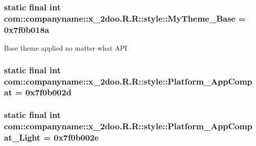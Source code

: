 \hypertarget{classcom_1_1companyname_1_1x__2doo_1_1_r_1_1style_c3cec50d05990fe7235e6851725a287e}{
\subsubsection[{MyTheme\_\-Base}]{\setlength{\rightskip}{0pt plus 5cm}static final int com::companyname::x\_\-2doo.R.R::style::MyTheme\_\-Base = 0x7f0b018a}}
\label{classcom_1_1companyname_1_1x__2doo_1_1_r_1_1style_c3cec50d05990fe7235e6851725a287e}


Base theme applied no matter what API \hypertarget{classcom_1_1companyname_1_1x__2doo_1_1_r_1_1style_76df383bfe1d7bd0d08fe5739b0b4dd5}{
\subsubsection[{Platform\_\-AppCompat}]{\setlength{\rightskip}{0pt plus 5cm}static final int com::companyname::x\_\-2doo.R.R::style::Platform\_\-AppCompat = 0x7f0b002d}}
\label{classcom_1_1companyname_1_1x__2doo_1_1_r_1_1style_76df383bfe1d7bd0d08fe5739b0b4dd5}


\hypertarget{classcom_1_1companyname_1_1x__2doo_1_1_r_1_1style_0d2e7f993e586016b744975db1e6d205}{
\subsubsection[{Platform\_\-AppCompat\_\-Light}]{\setlength{\rightskip}{0pt plus 5cm}static final int com::companyname::x\_\-2doo.R.R::style::Platform\_\-AppCompat\_\-Light = 0x7f0b002e}}
\label{classcom_1_1companyname_1_1x__2doo_1_1_r_1_1style_0d2e7f993e586016b744975db1e6d205}


